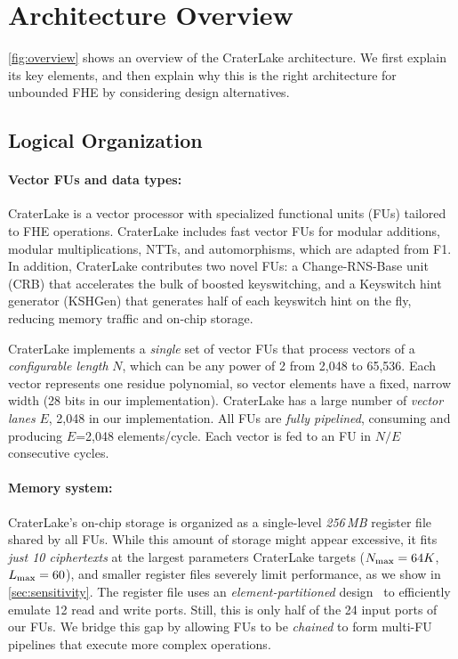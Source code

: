 \section{Architecture Overview}\label{sec:overview}

\autoref{fig:overview} shows an overview of the CraterLake architecture. We first
explain its key elements, and then explain why this is the right architecture
for unbounded FHE by considering design alternatives.

\subsection{Logical Organization}

\paragraph{Vector FUs and data types:}
CraterLake is a vector processor with specialized functional units (FUs)
tailored to FHE operations. CraterLake includes fast vector FUs for modular
additions, modular multiplications, NTTs, and automorphisms, which are adapted
from F1. In addition, CraterLake contributes two novel FUs: a Change-RNS-Base
unit (CRB) that accelerates the bulk of boosted keyswitching, and a Keyswitch
hint generator (KSHGen) that generates half of each keyswitch hint on the fly,
reducing memory traffic and on-chip storage.

\figOverview

CraterLake implements a \emph{single} set of vector FUs that process vectors of
a \emph{configurable length} $N$, which can be any power of 2 from 2,048 to
65,536. Each vector represents one residue polynomial, so vector elements have
a fixed, narrow width (28 bits in our implementation). CraterLake has a large
number of \emph{vector lanes} $E$, 2,048 in our implementation. All FUs are
\emph{fully pipelined}, consuming and producing $E$=2,048 elements/cycle. Each
vector is fed to an FU in $N/E$ consecutive cycles.

\paragraph{Memory system:}
CraterLake's on-chip storage is organized as a single-level \emph{256\,MB}
register file shared by all FUs. While this amount of storage might appear
excessive, it fits \emph{just 10 ciphertexts} at the largest parameters
CraterLake targets ($N_{\textrm{max}} = 64K$, $L_{\textrm{max}} = 60$), and smaller register files
severely limit performance, as we show in \autoref{sec:sensitivity}. The
register file uses an \emph{element-partitioned}
design~\cite{asanovic:ucb98:vector} to efficiently emulate 12 read and write
ports. Still, this is only half of the 24 input ports of our FUs. We bridge
this gap by allowing FUs to be \emph{chained} to form multi-FU pipelines that
execute more complex operations.

